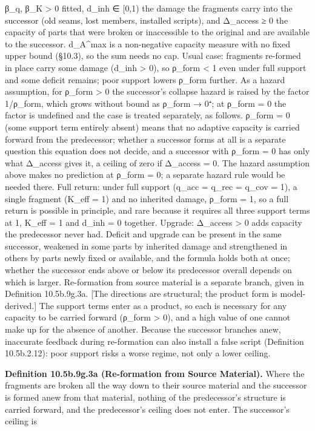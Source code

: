 \documentclass[
]{article}
\begin{document}
β\_q, β\_K \textgreater{} 0 fitted, d\_inh ∈ {[}0,1) the damage the
fragments carry into the successor (old seams, lost members, installed
scripts), and Δ\_access ≥ 0 the capacity of parts that were broken or
inaccessible to the original and are available to the successor.
d\_A\^{}max is a non-negative capacity measure with no fixed upper bound
(§10.3), so the sum needs no cap. Usual case: fragments re-formed in
place carry some damage (d\_inh \textgreater{} 0), so ρ\_form
\textless{} 1 even under full support and some deficit remains; poor
support lowers ρ\_form further. As a hazard assumption, for ρ\_form
\textgreater{} 0 the successor's collapse hazard is raised by the factor
1/ρ\_form, which grows without bound as ρ\_form → 0⁺; at ρ\_form = 0 the
factor is undefined and the case is treated separately, as follows.
ρ\_form = 0 (some support term entirely absent) means that no adaptive
capacity is carried forward from the predecessor; whether a successor
forms at all is a separate question this equation does not decide, and a
successor with ρ\_form = 0 has only what Δ\_access gives it, a ceiling
of zero if Δ\_access = 0. The hazard assumption above makes no
prediction at ρ\_form = 0; a separate hazard rule would be needed there.
Full return: under full support (q\_acc = q\_rec = q\_cov = 1), a single
fragment (K\_eff = 1) and no inherited damage, ρ\_form = 1, so a full
return is possible in principle, and rare because it requires all three
support terms at 1, K\_eff = 1 and d\_inh = 0 together. Upgrade:
Δ\_access \textgreater{} 0 adds capacity the predecessor never had.
Deficit and upgrade can be present in the same successor, weakened in
some parts by inherited damage and strengthened in others by parts newly
fixed or available, and the formula holds both at once; whether the
successor ends above or below its predecessor overall depends on which
is larger. Re-formation from source material is a separate branch, given
in Definition 10.5b.9g.3a. {[}The directions are structural; the product
form is model-derived.{]} The support terms enter as a product, so each
is necessary for any capacity to be carried forward (ρ\_form
\textgreater{} 0), and a high value of one cannot make up for the
absence of another. Because the successor branches anew, inaccurate
feedback during re-formation can also install a false script (Definition
10.5b.2.12): poor support risks a worse regime, not only a lower
ceiling.

\textbf{Definition 10.5b.9g.3a (Re-formation from Source Material).}
Where the fragments are broken all the way down to their source material
and the successor is formed anew from that material, nothing of the
predecessor's structure is carried forward, and the predecessor's
ceiling does not enter. The successor's ceiling is
\end{document}
